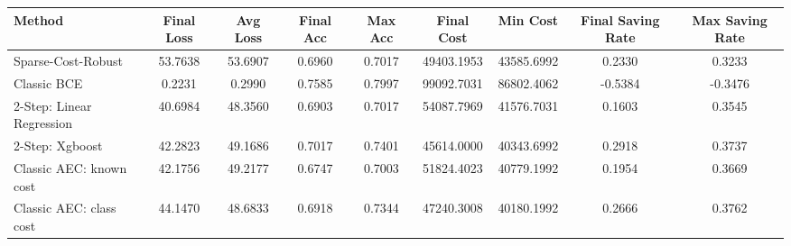 \begin{tabular}{lcccccccc}
\toprule
Method & Final Loss & Avg Loss & Final Acc & Max Acc & Final Cost & Min Cost & Final Saving Rate & Max Saving Rate \\
\midrule
Sparse-Cost-Robust & 53.7638 & 53.6907 & 0.6960 & 0.7017 & 49403.1953 & 43585.6992 & 0.2330 & 0.3233 \\
Classic BCE & 0.2231 & 0.2990 & 0.7585 & 0.7997 & 99092.7031 & 86802.4062 & -0.5384 & -0.3476 \\
2-Step: Linear Regression & 40.6984 & 48.3560 & 0.6903 & 0.7017 & 54087.7969 & 41576.7031 & 0.1603 & 0.3545 \\
2-Step: Xgboost & 42.2823 & 49.1686 & 0.7017 & 0.7401 & 45614.0000 & 40343.6992 & 0.2918 & 0.3737 \\
Classic AEC: known cost & 42.1756 & 49.2177 & 0.6747 & 0.7003 & 51824.4023 & 40779.1992 & 0.1954 & 0.3669 \\
Classic AEC: class cost & 44.1470 & 48.6833 & 0.6918 & 0.7344 & 47240.3008 & 40180.1992 & 0.2666 & 0.3762 \\
\bottomrule
\end{tabular}
